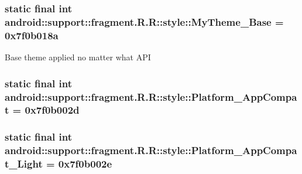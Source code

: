 \hypertarget{classandroid_1_1support_1_1fragment_1_1_r_1_1style_d6f4c3b2ff4f39719d546c19714f5d3e}{
\subsubsection[{MyTheme\_\-Base}]{\setlength{\rightskip}{0pt plus 5cm}static final int android::support::fragment.R.R::style::MyTheme\_\-Base = 0x7f0b018a}}
\label{classandroid_1_1support_1_1fragment_1_1_r_1_1style_d6f4c3b2ff4f39719d546c19714f5d3e}


Base theme applied no matter what API \hypertarget{classandroid_1_1support_1_1fragment_1_1_r_1_1style_620d8d15ce9efcc4c942134fd0df9f38}{
\subsubsection[{Platform\_\-AppCompat}]{\setlength{\rightskip}{0pt plus 5cm}static final int android::support::fragment.R.R::style::Platform\_\-AppCompat = 0x7f0b002d}}
\label{classandroid_1_1support_1_1fragment_1_1_r_1_1style_620d8d15ce9efcc4c942134fd0df9f38}


\hypertarget{classandroid_1_1support_1_1fragment_1_1_r_1_1style_24278543be93c579db5bef3a6852d8e6}{
\subsubsection[{Platform\_\-AppCompat\_\-Light}]{\setlength{\rightskip}{0pt plus 5cm}static final int android::support::fragment.R.R::style::Platform\_\-AppCompat\_\-Light = 0x7f0b002e}}
\label{classandroid_1_1support_1_1fragment_1_1_r_1_1style_24278543be93c579db5bef3a6852d8e6}


